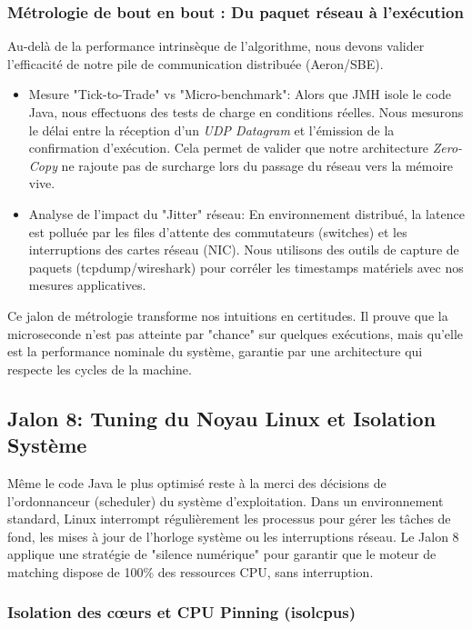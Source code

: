 \subsubsection{Métrologie de bout en bout : Du paquet réseau à l'exécution}

Au-delà de la performance intrinsèque de l'algorithme, nous devons valider l'efficacité de notre pile de communication distribuée (Aeron/SBE).

\begin{itemize}
    \item Mesure "Tick-to-Trade" vs "Micro-benchmark": Alors que JMH isole le code Java, nous effectuons des tests de charge en conditions réelles. Nous mesurons le délai entre la réception d'un \textit{UDP Datagram} et l'émission de la confirmation d'exécution. Cela permet de valider que notre architecture \textit{Zero-Copy} ne rajoute pas de surcharge lors du passage du réseau vers la mémoire vive.
    \item Analyse de l'impact du "Jitter" réseau: En environnement distribué, la latence est polluée par les files d'attente des commutateurs (switches) et les interruptions des cartes réseau (NIC). Nous utilisons des outils de capture de paquets (tcpdump/wireshark) pour corréler les timestamps matériels avec nos mesures applicatives.
\end{itemize}

Ce jalon de métrologie transforme nos intuitions en certitudes. Il prouve que la microseconde n'est pas atteinte par "chance" sur quelques exécutions, mais qu'elle est la performance nominale du système, garantie par une architecture qui respecte les cycles de la machine.

\subsection{Jalon 8: Tuning du Noyau Linux et Isolation Système}

Même le code Java le plus optimisé reste à la merci des décisions de l'ordonnanceur (scheduler) du système d'exploitation. Dans un environnement standard, Linux interrompt régulièrement les processus pour gérer les tâches de fond, les mises à jour de l'horloge système ou les interruptions réseau. Le Jalon 8 applique une stratégie de "silence numérique" pour garantir que le moteur de matching dispose de 100\% des ressources CPU, sans interruption.

\subsubsection{Isolation des cœurs et CPU Pinning (isolcpus)}

